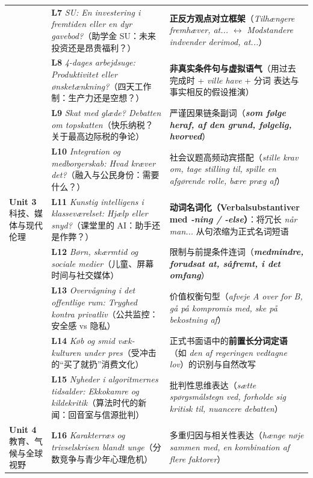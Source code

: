 \documentclass[10.5pt, a4paper]{ctexart}
\begin{document}
{\begin{longtable}{@{} >{\raggedright\arraybackslash}p{2.65cm} >{\raggedright\arraybackslash}p{5.7cm} >{\raggedright\arraybackslash}p{7.25cm} @{}}
 & \textbf{L7} \textit{SU: En investering i fremtiden eller en dyr gavebod?}（助学金 SU：未来投资还是昂贵福利？） & \textbf{正反方观点对立框架}（\textit{Tilhængere fremhæver, at...} $\leftrightarrow$ \textit{Modstandere indvender derimod, at...}） \\
 & \textbf{L8} \textit{4-dages arbejdsuge: Produktivitet eller ønsketænkning?}（四天工作制：生产力还是空想？） & \textbf{非真实条件句与虚拟语气}（用过去完成时 + \textit{ville have} + 分词 表达与事实相反的假设推演） \\
 & \textbf{L9} \textit{Skat med glæde? Debatten om topskatten}（快乐纳税？关于最高边际税的争论） & 严谨因果链条副词（\textbf{\textit{som følge heraf, af den grund, følgelig, hvorved}}） \\
 & \textbf{L10} \textit{Integration og medborgerskab: Hvad kræver det?}（融入与公民身份：需要什么？） & 社会议题高频动宾搭配（\textit{stille krav om, tage stilling til, spille en afgørende rolle, bære præg af}） \\
\midrule
\textbf{Unit 3}\newline 科技、媒体与\newline 现代伦理 & \textbf{L11} \textit{Kunstig intelligens i klasseværelset: Hjælp eller snyd?}（课堂里的 AI：助手还是作弊？） & \textbf{动词名词化（Verbalsubstantiver med \textit{-ning / -else}）}：将冗长 \textit{når man...} 从句浓缩为正式名词短语 \\
 & \textbf{L12} \textit{Børn, skærmtid og sociale medier}（儿童、屏幕时间与社交媒体） & 限制与前提条件连词（\textbf{\textit{medmindre, forudsat at, såfremt, i det omfang}}） \\
 & \textbf{L13} \textit{Overvågning i det offentlige rum: Tryghed kontra privatliv}（公共监控：安全感 vs 隐私） & 价值权衡句型（\textit{afveje A over for B, gå på kompromis med, ske på bekostning af}） \\
 & \textbf{L14} \textit{Køb og smid væk-kulturen under pres}（受冲击的“买了就扔”消费文化） & 正式书面语中的\textbf{前置长分词定语}（如 \textit{den af regeringen vedtagne lov}）的识别与自然改写 \\
 & \textbf{L15} \textit{Nyheder i algoritmernes tidsalder: Ekkokamre og kildekritik}（算法时代的新闻：回音室与信源批判） & 批判性思维表达（\textit{sætte spørgsmålstegn ved, forholde sig kritisk til, nuancere debatten}） \\
\midrule
\textbf{Unit 4}\newline 教育、气候与\newline 全球视野 & \textbf{L16} \textit{Karakterræs og trivselskrisen blandt unge}（分数竞争与青少年心理危机） & 多重归因与相关性表达（\textit{hænge nøje sammen med, en kombination af flere faktorer}） \\

\end{longtable}}
\end{document}
